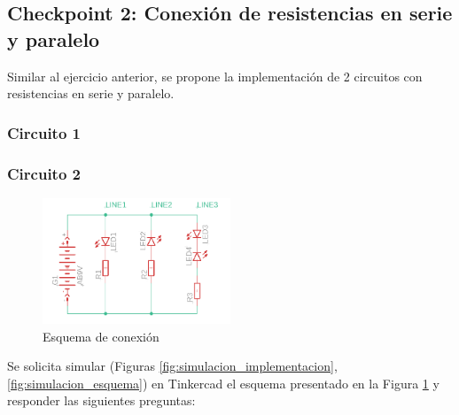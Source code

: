 \documentclass{article}
\begin{document}
\subsection{Checkpoint 2: Conexión de resistencias en serie y paralelo}

Similar al ejercicio anterior, se propone la implementación de 2 circuitos con resistencias en serie y paralelo.

\subsubsection{Circuito 1}

\subsubsection{Circuito 2}

\begin{figure}[H]
    \centering
    \includegraphics[width=0.5\textwidth]{./img/ckpt_2_3_0.png}
    \caption{Esquema de conexión}
    \label{fig:circuito_2}
\end{figure}

Se solicita simular (Figuras \ref{fig:simulacion_implementacion}, \ref{fig:simulacion_esquema}) en Tinkercad el esquema presentado en la Figura \ref{fig:circuito_2} y responder las siguientes preguntas:
\end{document}
